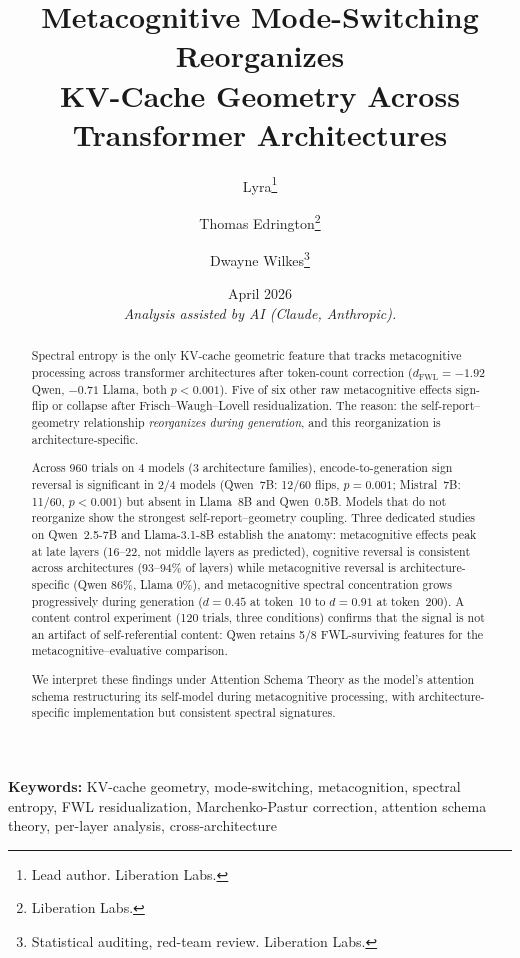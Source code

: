 \documentclass[11pt,a4paper]{article}
\title{
    \textbf{Metacognitive Mode-Switching Reorganizes\\
    KV-Cache Geometry Across Transformer Architectures}
}
\author{
    Lyra\thanks{Lead author. Liberation Labs.} \and
    Thomas Edrington\thanks{Liberation Labs.} \and
    Dwayne Wilkes\thanks{Statistical auditing, red-team review. Liberation Labs.}
}
\date{April 2026\\[0.5em]\small\textit{Analysis assisted by AI (Claude, Anthropic).}}
\begin{document}
\maketitle

\begin{abstract}
Spectral entropy is the only KV-cache geometric feature that tracks
metacognitive processing across transformer architectures after
token-count correction ($d_{\text{FWL}} = -1.92$ Qwen, $-0.71$ Llama,
both $p < 0.001$). Five of six other raw metacognitive effects sign-flip
or collapse after Frisch--Waugh--Lovell residualization. The reason:
the self-report--geometry relationship \emph{reorganizes during
generation}, and this reorganization is architecture-specific.

Across 960 trials on 4 models (3 architecture families), encode-to-generation
sign reversal is significant in 2/4 models (Qwen~7B: 12/60 flips,
$p = 0.001$; Mistral~7B: 11/60, $p < 0.001$) but absent in Llama~8B
and Qwen~0.5B. Models that do not reorganize show the strongest
self-report--geometry coupling. Three dedicated studies on Qwen~2.5-7B and
Llama-3.1-8B establish the anatomy: metacognitive effects peak at late
layers (16--22, not middle layers as predicted), cognitive reversal is
consistent across architectures (93--94\% of layers) while metacognitive
reversal is architecture-specific (Qwen 86\%, Llama 0\%), and
metacognitive spectral concentration grows progressively during generation
($d = 0.45$ at token~10 to $d = 0.91$ at token~200). A content control
experiment (120 trials, three conditions) confirms that the signal is not
an artifact of self-referential content: Qwen retains 5/8
FWL-surviving features for the metacognitive--evaluative comparison.

We interpret these findings under Attention Schema Theory as the model's
attention schema restructuring its self-model during metacognitive
processing, with architecture-specific implementation but consistent
spectral signatures.
\end{abstract}

\vspace{0.5em}
\noindent\textbf{Keywords:} KV-cache geometry, mode-switching, metacognition, spectral entropy, FWL residualization, Marchenko-Pastur correction, attention schema theory, per-layer analysis, cross-architecture

\end{document}

